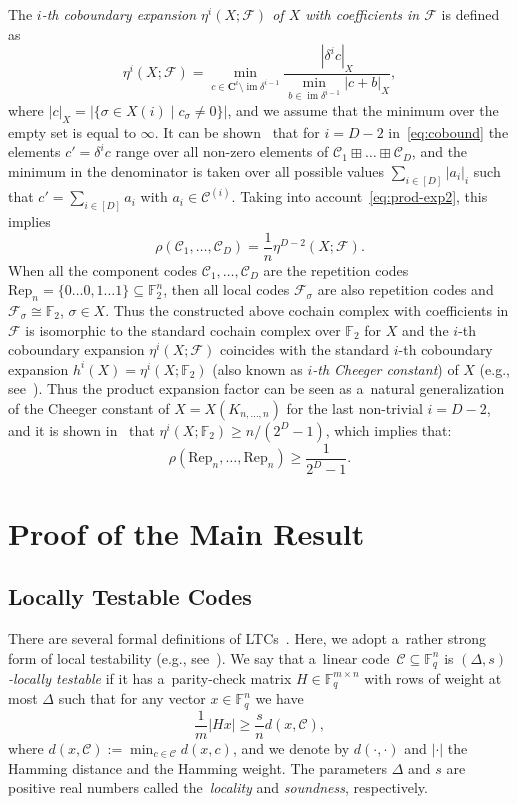 \documentclass[conference]{IEEEtran}
\let\ge\geqslant
\theoremstyle{plain}
\theoremstyle{definition}
\theoremstyle{remark}
\newcommand{\bC}{\mathbf{C}}
\newcommand{\abs}[1]{\left\lvert #1 \right\rvert}
\newcommand{\cC}{\mathcal{C}}
\newcommand{\cF}{\mathcal{F}}
\newcommand{\F}{\mathbb{F}}
\DeclareMathOperator{\im}{im}
\begin{document}
The \emph{$i$-th coboundary expansion $\eta^i(X;\cF)$ of $X$ with coefficients in $\cF$} is defined as 
\begin{equation}\label{eq:cobound}
	\eta^i(X;\cF) = \min_{c\in \bC^i\setminus \im \delta^{i-1}} \frac{\abs{\delta^i c}_X}{\min_{b\in \im \delta^{i-1}}\abs{c + b}_X},
\end{equation}
where $\abs{c}_X = \abs{\{\sigma\in X(i)\mid c_\sigma \ne 0\}}$, and we assume that the minimum over the empty set is equal to $\infty$. 	
It can be shown~\cite{kalachevTwosidedRobustlyTestable2023} that for $i=D-2$ in~\eqref{eq:cobound} the elements $c' = \delta^i c$ range over all non-zero elements of  $\cC_1\boxplus \dots\boxplus \cC_D$, and the minimum in the denominator  is taken over all possible values $\sum_{i\in [D]} \abs{a_i}_i$ such that $c' = \sum_{i\in[D]} a_i$ with $a_i\in \cC^{(i)}$.
Taking into account~\eqref{eq:prod-exp2}, this implies  
\[
\rho(\cC_1,\dots,\cC_D) = \frac{1}{n}\eta^{D-2}(X;\cF).
\]
When all the component codes $\cC_1,\dots,\cC_D$ are the repetition codes $\mathrm{Rep}_n = \{0\dots0,1\dots 1\}\subseteq \F_2^n$, then all local codes $\cF_\sigma$ are also repetition codes and $\cF_\sigma\cong \F_2$, $\sigma\in X$. Thus the constructed above cochain complex with coefficients in $\cF$ is isomorphic to the standard cochain complex over $\F_2$ for $X$ and the $i$-th coboundary expansion $\eta^i(X;\cF)$ coincides with the standard $i$-th coboundary expansion $h^i(X) = \eta^i(X;\F_2)$ (also known as \emph{$i$-th Cheeger constant}) of $X$ (e.g., see~\cite[Definition~2.9]{dotterrerCoboundaryExpanders2012}).
Thus the product expansion factor can be seen as a~natural generalization of the Cheeger constant of $X=X(K_{n,\dots,n})$ for the last non-trivial $i = D-2$, and it is shown in~\cite[Proposition~5.7]{dotterrerCoboundaryExpanders2012} that $\eta^{i}(X;\F_2) \ge n/(2^{D} - 1)$, which implies that:
\[ \rho(\mathrm{Rep}_n,\dots,\mathrm{Rep}_n) \ge \frac{1}{2^{D} - 1}. \]


\section{Proof of the Main Result}



\subsection{Locally Testable Codes}
There are several formal definitions of LTCs~\cite{Goldreich:2010}. Here, we adopt a~rather strong form of local testability (e.g., see~\cite{Leverrier:2021a}). We say that a~linear code~$\mathcal{C} \subseteq \mathbb{F}_q^n$ is {\emph{$(\Delta,s)$-locally testable}} if it has a~parity-check matrix $H\in \F_q^{m\times n}$ with rows of weight at most $\Delta$ such that for any vector $x \in \mathbb{F}_q^n$ we have
\[ \frac{1}{m} | H x | \geqslant \frac{s}{n} d(x, \mathcal{C}), \]
where $d(x, \mathcal{C}) := \min_{c\in\cC} d(x,c)$, and we denote by $d(\cdot,\cdot)$ and $|\cdot|$ the Hamming distance and the Hamming weight.
The parameters $\Delta$ and $s$ are positive real numbers called the~\emph{locality} and \emph{soundness}, respectively. 
\end{document}
